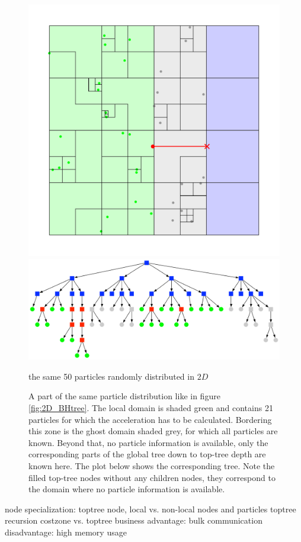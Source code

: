 \begin{figure}[htbp]
\begin{center}
\includegraphics[scale=0.6]{quadtree50_xy_TPL2.pdf}
\includegraphics[scale=0.3]{quadtree50_TPL2.pdf}
\caption{the same 50 particles randomly distributed in $2D$}
\caption{A part of the same particle distribution like in figure \ref{fig:2D_BHtree}. The local domain is shaded green and contains 21 particles for which the acceleration has to be calculated. Bordering this zone is the ghost domain shaded grey, for which all particles are known. Beyond that, no particle information is available, only the corresponding parts of the global tree down to top-tree depth are known here. The plot below shows the corresponding tree. Note the filled top-tree nodes without any children nodes, they correspond to the domain where no particle information is available.}
\label{fig:2D_BHtree_costzone}
\end{center}
\end{figure}

node specialization: toptree node, local vs. non-local nodes and particles
toptree recursion
costzone vs. toptree business
advantage: bulk communication
disadvantage: high memory usage